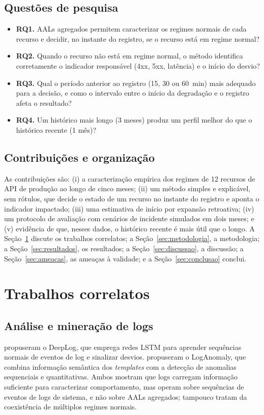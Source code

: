 \documentclass[sigconf,nonacm]{acmart}
\begin{document}
\subsection{Questões de pesquisa}
\begin{itemize}
  \item \textbf{RQ1.} AALs agregados permitem caracterizar os regimes normais de cada recurso e decidir, no instante do registro, se o recurso está em regime normal?
  \item \textbf{RQ2.} Quando o recurso não está em regime normal, o método identifica corretamente o indicador responsável (4xx, 5xx, latência) e o início do desvio?
  \item \textbf{RQ3.} Qual o período anterior ao registro (15, 30 ou 60~min) mais adequado para a decisão, e como o intervalo entre o início da degradação e o registro afeta o resultado?
  \item \textbf{RQ4.} Um histórico mais longo (3 meses) produz um perfil melhor do que o histórico recente (1 mês)?
\end{itemize}

\subsection{Contribuições e organização}
As contribuições são: (i) a caracterização empírica dos regimes de 12 recursos de API de produção ao longo de cinco meses; (ii) um método simples e explicável, sem rótulos, que decide o estado de um recurso no instante do registro e aponta o indicador impactado; (iii) uma estimativa de início por expansão retroativa; (iv) um protocolo de avaliação com cenários de incidente simulados em dois meses; e (v) evidência de que, nesses dados, o histórico recente é mais útil que o longo. A Seção~\ref{sec:correlatos} discute os trabalhos correlatos; a Seção~\ref{sec:metodologia}, a metodologia; a Seção~\ref{sec:resultados}, os resultados; a Seção~\ref{sec:discussao}, a discussão; a Seção~\ref{sec:ameacas}, as ameaças à validade; e a Seção~\ref{sec:conclusao} conclui.

\section{Trabalhos correlatos}\label{sec:correlatos}

\subsection{Análise e mineração de logs}
\citet{du2017deeplog} propuseram o DeepLog, que emprega redes LSTM para aprender sequências normais de eventos de log e sinalizar desvios. \citet{meng2019loganomaly} propuseram o LogAnomaly, que combina informação semântica dos \emph{templates} com a detecção de anomalias sequenciais e quantitativas. Ambos mostram que logs carregam informação suficiente para caracterizar comportamento, mas operam sobre sequências de eventos de logs de sistema, e não sobre AALs agregados; tampouco tratam da coexistência de múltiplos regimes normais.
\end{document}
